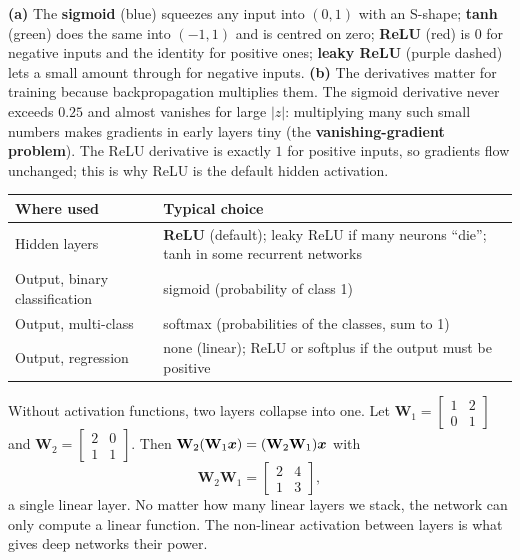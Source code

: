 \begin{explain}
\textbf{(a)} The \textbf{sigmoid} (blue) squeezes any input into $(0,1)$ with an S-shape; \textbf{tanh} (green) does the same into $(-1,1)$ and is centred on zero; \textbf{ReLU} (red) is $0$ for negative inputs and the identity for positive ones; \textbf{leaky ReLU} (purple dashed) lets a small amount through for negative inputs. \textbf{(b)} The derivatives matter for training because backpropagation multiplies them. The sigmoid derivative never exceeds $0.25$ and almost vanishes for large $|z|$: multiplying many such small numbers makes gradients in early layers tiny (the \textbf{vanishing-gradient problem}). The ReLU derivative is exactly $1$ for positive inputs, so gradients flow unchanged; this is why ReLU is the default hidden activation.
\end{explain}

\begin{center}
\begin{tabular}{@{}p{3.3cm}p{10.2cm}@{}}
\toprule
\textbf{Where used} & \textbf{Typical choice}\\
\midrule
Hidden layers & \textbf{ReLU} (default); leaky ReLU if many neurons ``die''; tanh in some recurrent networks\\
Output, binary classification & sigmoid (probability of class 1)\\
Output, multi-class & softmax (probabilities of the classes, sum to 1)\\
Output, regression & none (linear); ReLU or softplus if the output must be positive\\
\bottomrule
\end{tabular}
\end{center}

\begin{example}
Without activation functions, two layers collapse into one. Let $\mathbf W_1=\begin{bmatrix}1&2\\0&1\end{bmatrix}$ and $\mathbf W_2=\begin{bmatrix}2&0\\1&1\end{bmatrix}$. Then $\mathbf W_2(\mathbf W_1\boldsymbol{x})=(\mathbf W_2\mathbf W_1)\boldsymbol{x}$ with
\[
  \mathbf W_2\mathbf W_1=\begin{bmatrix}2&4\\1&3\end{bmatrix},
\]
a single linear layer. No matter how many linear layers we stack, the network can only compute a linear function. The non-linear activation between layers is what gives deep networks their power.
\end{example}

